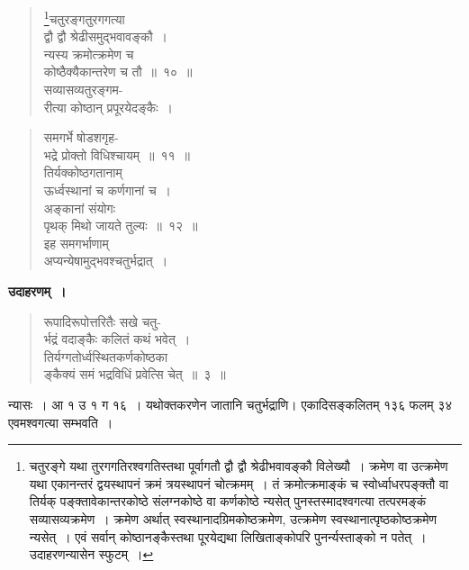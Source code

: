 \documentclass[11pt, openany]{book}
\begin{document}
\begin{quote}
\renewcommand{\thefootnote}{१}\footnote{चतुरङ्गे यथा तुरगगतिरश्वगतिस्तथा पूर्वागतौ द्वौ द्वौ श्रेढीभवावङ्कौ विलेख्यौ~। क्रमेण वा उत्क्रमेण यथा एकानन्तरं द्वयस्थापनं क्रमं त्रयस्थापनं चोत्क्रमम्~। तं क्रमोत्क्रमाङ्कं च स्वोर्ध्वाधरपङ्क्तौ वा तिर्यक् पङ्क्तावेकान्तरकोष्ठे संलग्नकोष्ठे वा कर्णकोष्ठे न्यसेत् पुनस्तस्मादश्वगत्या तत्परमङ्कं सव्यासव्यक्रमेण~। क्रमेण अर्थात् स्वस्थानादग्रिमकोष्ठक्रमेण, उत्क्रमेण स्वस्थानात्पृष्ठकोष्ठक्रमेण न्यसेत्~। एवं सर्वान् कोष्ठानङ्कैस्तथा पूरयेद्यथा लिखिताङ्कोपरि पुनर्न्यस्ताङ्को न पतेत्~। उदाहरणन्यासेन स्फुटम्~।}{\gk चतुरङ्गतुरगगत्या\\
द्वौ द्वौ श्रेढीसमुद्भवावङ्कौ~।\\
न्यस्य क्रमोत्क्रमेण च\\
कोष्ठैक्यैकान्तरेण च तौ~॥~१०~॥\\
सव्यासव्यतुरङ्गम-\\
रीत्या कोष्ठान् प्रपूरयेदङ्कैः~।}
\end{quote}

\newpage 

\begin{quote}
{\gk समगर्भे षोडशगृह-\\
भद्रे प्रोक्तो विधिश्चायम्~॥~११~॥\\
तिर्यक्कोष्ठगतानाम्\\
ऊर्ध्वस्थानां च कर्णगानां च~।\\
अङ्कानां संयोगः\\
पृथक् मिथो जायते तुल्यः~॥~१२~॥\\
इह समगर्भाणाम्\\
अप्यन्येषामुद्भवश्चतुर्भद्रात्~।}
\end{quote}

\textbf{उदाहरणम्~।}

\begin{quote}
{\ex रूपादिरूपोत्तरितैः सखे चतु-\\
र्भद्रं वदाङ्कैः कलितं कथं भवेत्~।\\
तिर्यग्गतोर्ध्वस्थितकर्णकोष्ठका\\
ङ्कैक्यं समं भद्रविधिं प्रवेत्सि चेत्~॥~३~॥	}
\end{quote}

न्यासः~। आ १ उ १ ग १६~। यथोक्तकरणेन जातानि चतुर्भद्राणि। एकादिसङ्कलितम् १३६ फलम् ३४ एवमश्वगत्या सम्भवति~।
\end{document}
